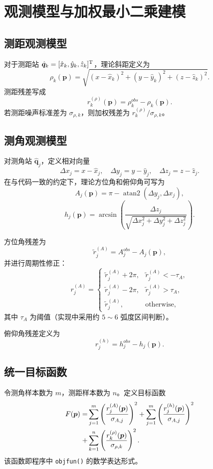\chapter{观测模型与加权最小二乘建模}

\section{测距观测模型}
对于测距站 $\hat{\bm q}_k=[\hat{x}_k,\hat{y}_k,\hat{z}_k]^{\mathrm{T}}$，理论斜距定义为
\begin{equation}
\rho_k(\bm p)=\sqrt{(x-\hat{x}_k)^2+(y-\hat{y}_k)^2+(z-\hat{z}_k)^2}.
\label{eq:rho_model}
\end{equation}
测距残差写成
\begin{equation}
r^{(\rho)}_k(\bm p)=\rho_k^{obs}-\rho_k(\bm p).
\end{equation}
若测距噪声标准差为 $\sigma_{\rho,k}$，则加权残差为 $r^{(\rho)}_k/\sigma_{\rho,k}$。

\section{测角观测模型}
对测角站 $\hat{\bm q}_j$，定义相对向量
\[
\Delta x_j=x-\hat{x}_j,\quad
\Delta y_j=y-\hat{y}_j,\quad
\Delta z_j=z-\hat{z}_j.
\]
在与代码一致的约定下，理论方位角和俯仰角可写为
\begin{equation}
A_j(\bm p)=\pi-\operatorname{atan2}(\Delta y_j,\Delta x_j),
\end{equation}
\begin{equation}
h_j(\bm p)=\arcsin\left(\frac{\Delta z_j}{\sqrt{\Delta x_j^2+\Delta y_j^2+\Delta z_j^2}}\right).
\end{equation}

方位角残差为
\[
\tilde r^{(A)}_j=A_j^{obs}-A_j(\bm p),
\]
并进行周期性修正：
\[
r^{(A)}_j=
\begin{cases}
\tilde r^{(A)}_j+2\pi, & \tilde r^{(A)}_j<-\tau_A,\\
\tilde r^{(A)}_j-2\pi, & \tilde r^{(A)}_j>\tau_A,\\
\tilde r^{(A)}_j, & \text{otherwise},
\end{cases}
\]
其中 $\tau_A$ 为阈值（实现中采用约 $5\sim 6$ 弧度区间判断）。

俯仰角残差定义为
\[
r^{(h)}_j=h_j^{obs}-h_j(\bm p).
\]

\section{统一目标函数}
令测角样本数为 $m$，测距样本数为 $n$。定义目标函数
\begin{align}
F(\bm p)=
&\sum_{j=1}^{m}\left(\frac{r^{(A)}_j(\bm p)}{\sigma_{A,j}}\right)^2
+\sum_{j=1}^{m}\left(\frac{r^{(h)}_j(\bm p)}{\sigma_{A,j}}\right)^2 \notag\\
+&\sum_{k=1}^{n}\left(\frac{r^{(\rho)}_k(\bm p)}{\sigma_{\rho,k}}\right)^2.
\label{eq:objective}
\end{align}
该函数即程序中 \texttt{objfun()} 的数学表达形式。


